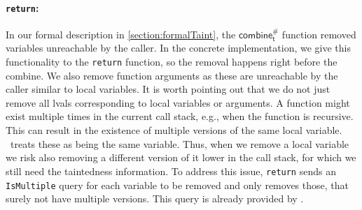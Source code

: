           \paragraph{\texttt{return}:} In our formal description in \autoref{section:formalTaint}, the $\textsf{combine}^{\#}_\textsf{t}$ function removed variables unreachable by the caller. In the concrete implementation, we give this functionality to the \texttt{return} function, so the removal happens right before the combine. We also remove function arguments as these are unreachable by the caller similar to local variables.
          It is worth pointing out that we do not just remove all \ac{lval}s corresponding to local variables or arguments. A function might exist multiple times in the current call stack, e.g., when the function is recursive. This can result in the existence of multiple versions of the same local variable. \gob\ treats these as being the same variable. Thus, when we remove a local variable we risk also removing a different version of it lower in the call stack, for which we still need the taintedness information. To address this issue, \texttt{return} sends an \texttt{IsMultiple} query for each variable to be removed and only removes those, that surely not have multiple versions. This query is already provided by \gob.

